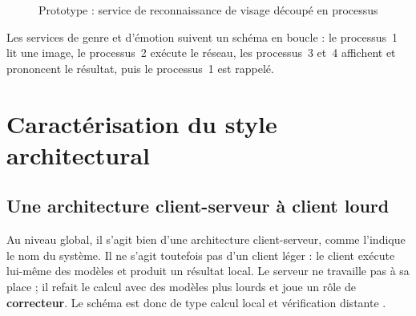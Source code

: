 \documentclass[11pt,a4paper]{report}
\newcommand{\ms}[1]{\texttt{#1}}
\begin{document}
\begin{figure}[H]
\centering
{}
\caption{Prototype : service de reconnaissance de visage découpé en processus}
\label{fig:proc1}
\end{figure}

Les services de genre et d'émotion suivent un schéma en boucle : le processus~1 lit une image, le processus~2 exécute le réseau, les processus~3 et~4 affichent et prononcent le résultat, puis le processus~1 est rappelé.

\section{Caractérisation du style architectural}

\subsection{Une architecture client-serveur à client lourd}
Au niveau global, il s'agit bien d'une architecture client-serveur, comme l'indique le nom du système. Il ne s'agit toutefois pas d'un client léger : le client exécute lui-même des modèles et produit un résultat local. Le serveur ne travaille pas à sa place ; il refait le calcul avec des modèles plus lourds et joue un rôle de \textbf{correcteur}. Le schéma est donc de type \og calcul local et vérification distante \fg.
\end{document}
